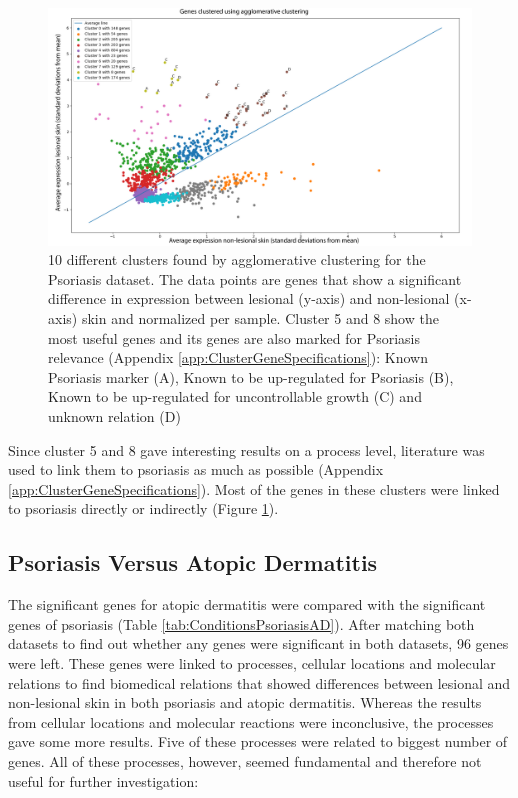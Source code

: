 \documentclass[10pt,a4paper]{report}
\begin{document}
	\begin{figure}[H]
		\includegraphics[width=\textwidth]{Cluster_Results.png}
		
		\caption{10 different clusters found by agglomerative clustering for the Psoriasis dataset. The data points are genes that show a significant difference in expression between lesional (y-axis) and non-lesional (x-axis) skin and normalized per sample. Cluster 5 and 8 show the most useful genes and its genes are also marked for Psoriasis relevance (Appendix \ref{app:ClusterGeneSpecifications}): Known Psoriasis marker (A), Known to be up-regulated for Psoriasis (B), Known to be up-regulated for uncontrollable growth (C) and unknown relation (D)}
		\label{fig:ClusteredGenes}
	\end{figure}
	
	Since cluster 5 and 8 gave interesting results on a process level, literature was used to link them to psoriasis as much as possible (Appendix \ref{app:ClusterGeneSpecifications}). Most of the genes in these clusters were linked to psoriasis directly or indirectly (Figure \ref{fig:ClusteredGenes}).
	
	\subsection{Psoriasis Versus Atopic Dermatitis}
	\label{subsec:ResultsPsoriasisVersusAtopicDermatitis}
	
	The significant genes for atopic dermatitis were compared with the significant genes of psoriasis (Table \ref{tab:ConditionsPsoriasisAD}). After matching both datasets to find out whether any genes were significant in both datasets, 96 genes were left. These genes were linked to processes, cellular locations and molecular relations to find biomedical relations that showed differences between lesional and non-lesional skin in both psoriasis and atopic dermatitis. Whereas the results from cellular locations and molecular reactions were inconclusive, the processes gave some more results. Five of these processes were related to biggest number of genes. All of these processes, however, seemed fundamental and therefore not useful for further investigation:
	
\end{document}
